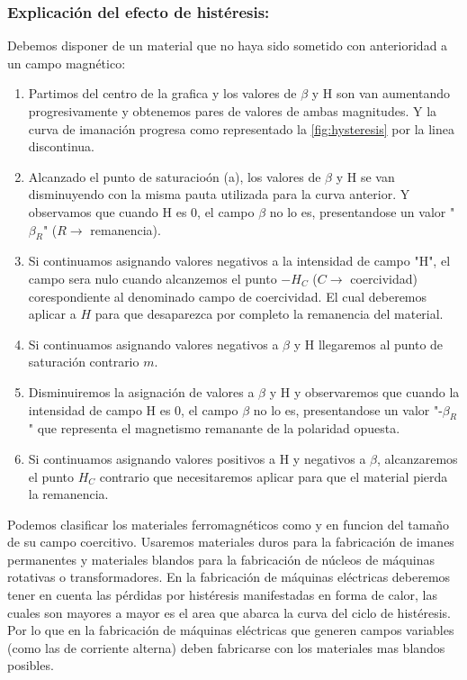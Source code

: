 \documentclass{report}
\begin{document}
    \subsubsection{Explicación del efecto de histéresis:}
Debemos disponer de un material que no haya sido sometido con anterioridad a un campo magnético:
\begin{enumerate}
  \item Partimos del centro de la grafica y los valores de $\beta$ y $\mathrm{H}$ son van aumentando progresivamente y obtenemos pares de valores
    de ambas magnitudes. Y la curva de imanación progresa como representado la \ref{fig:hysteresis} por la linea 
    discontinua.

  \item Alcanzado el punto de saturacioón (a), los valores de $\beta$ y $\mathrm{H}$ se van disminuyendo con la misma pauta utilizada para 
    la curva anterior. Y observamos que cuando $\mathrm{H}$ es 0, el campo $\beta$ no lo es, presentandose un valor "$\beta_R$" ($R \to$ remanencia).

  \item Si continuamos asignando valores negativos a la intensidad de campo  "$\mathrm{H}$", el campo sera nulo cuando 
    alcanzemos el punto $-H_C$ ($C \to$ coercividad) corespondiente al denominado campo de coercividad. El cual deberemos aplicar a $H$ para que desaparezca
    por completo la remanencia del material.

  \item Si continuamos asignando valores negativos a $\beta$ y $\mathrm{H}$ llegaremos al punto de saturación contrario $m$.

  \item Disminuiremos la asignación de valores a $\beta$ y $\mathrm{H}$ y observaremos que cuando la intensidad de campo $\mathrm{H}$ 
    es 0, el campo $\beta$ no lo es, presentandose un valor "-$\beta_R$" que representa el magnetismo remanante de la polaridad opuesta.
  \item Si continuamos asignando valores positivos a $\mathrm{H}$ y negativos a $\beta$, alcanzaremos el punto $H_C$ contrario
    que necesitaremos aplicar para que el material pierda la remanencia.
\end{enumerate}
\vspace{1.5em}
Podemos clasificar los materiales ferromagnéticos como  y  en funcion del tamaño de su campo coercitivo.
Usaremos materiales duros para la fabricación de imanes permanentes y materiales blandos para la fabricación de núcleos de máquinas rotativas 
o transformadores.
\fspace{1em}
En la fabricación de máquinas eléctricas deberemos tener en cuenta las pérdidas por histéresis manifestadas en forma de calor,
las cuales son mayores a mayor es el area que abarca la curva del ciclo de histéresis. Por lo que en la fabricación de máquinas eléctricas 
que generen campos variables (como las de corriente alterna) deben fabricarse con los materiales mas blandos posibles.
\end{document}
